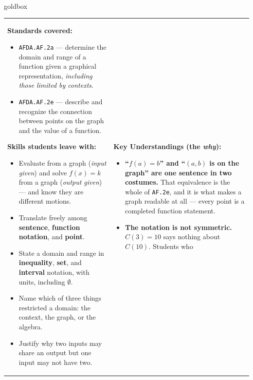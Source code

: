 \documentclass[10pt]{article}
\begin{document}
\renewcommand{\arraystretch}{1.6}
\begin{skillbox}{goldbox}
\begin{tabularx}{\linewidth}{@{}X|X@{}}
\begin{minipage}[t]{\linewidth}\vspace{0pt}
\textbf{Standards covered:}
\begin{itemize}[leftmargin=1.1em, itemsep=2pt, topsep=2pt]
  \item \texttt{AFDA.AF.2a} --- determine the domain and range of a function given a graphical
        representation, \emph{including those limited by contexts}.
  \item \texttt{AFDA.AF.2e} --- describe and recognize the connection between points on the graph
        and the value of a function.
\end{itemize}
\textbf{Skills students leave with:}
\begin{itemize}[leftmargin=1.1em, itemsep=2pt, topsep=2pt]
  \item Evaluate from a graph (\emph{input given}) and solve $f(x)=k$ from a graph
        (\emph{output given}) --- and know they are different motions.
  \item Translate freely among \textbf{sentence}, \textbf{function notation}, and \textbf{point}.
  \item State a domain and range in \textbf{inequality}, \textbf{set}, and \textbf{interval}
        notation, with units, including $\emptyset$.
  \item Name which of three things restricted a domain: the context, the graph, or the algebra.
  \item Justify why two inputs may share an output but one input may not have two.
\end{itemize}
\end{minipage}
&
\begin{minipage}[t]{\linewidth}\vspace{0pt}
\textbf{Key Understandings (the \emph{why}):}
\begin{itemize}[leftmargin=1.1em, itemsep=2pt, topsep=2pt]
  \item \textbf{``$f(a)=b$'' and ``$(a,b)$ is on the graph'' are one sentence in two costumes.}
        That equivalence is the whole of \texttt{AF.2e}, and it is what makes a graph readable
        at all --- every point is a completed function statement.
  \item \textbf{The notation is not symmetric.} $C(3)=10$ says nothing about $C(10)$. Students who

\end{itemize}
\end{minipage}
\end{tabularx}
\end{skillbox}
\end{document}
